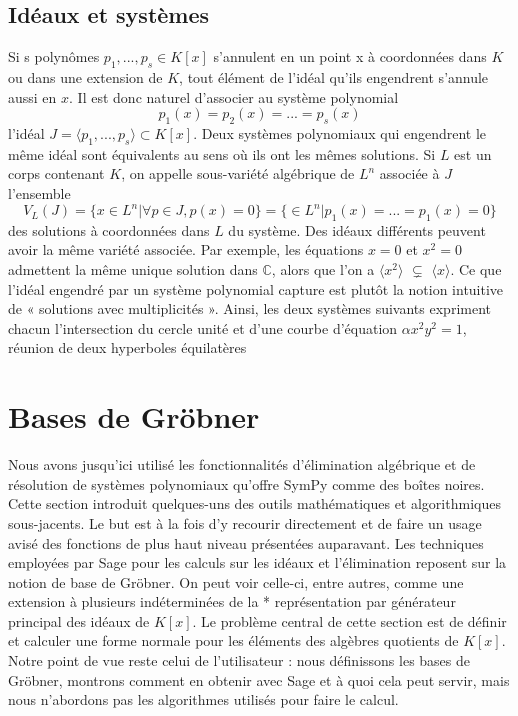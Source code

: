 \subsection{Idéaux et systèmes}
Si s polynômes $p_{1} , . . . , p_{s} \in K\left[x\right]$ s’annulent en un point x à coordonnées
dans $K$ ou dans une extension de $K$, tout élément de l’idéal qu’ils engendrent
s’annule aussi en $x$. Il est donc naturel d’associer au système polynomial
\[
p_{1}\left(x\right)= p_{2}\left(x\right)=...=p_{s}\left(x\right)
\]
l’idéal $J = \langle p_{1}, . . . , p_{s}\rangle \subset K\left[x\right]$. Deux systèmes polynomiaux qui engendrent le même idéal sont équivalents au sens où ils ont les mêmes solutions. Si $L$ est
un corps contenant $K$, on appelle sous-variété algébrique de $L^{n}$ associée à $J$
l’ensemble
\[
V_{L}\left(J\right) = \lbrace x \in L^{n} \vert \forall p \in J, p\left(x\right) = 0 \rbrace =
\lbrace \in L^{n} \vert p_{1}\left(x\right)=...=p_{1}\left(x\right)=0\rbrace
\]
des solutions à coordonnées dans $L$ du système. Des idéaux différents peuvent
avoir la même variété associée. Par exemple, les équations $x = 0$ et $x^{2} = 0$
admettent la même unique solution dans $\mathbb{C}$, alors que l’on a $\langle x^{2}\rangle$ $\subsetneq$ $\langle x\rangle$. Ce que l’idéal engendré par un système polynomial capture est plutôt la notion intuitive
de « solutions avec multiplicités ».
Ainsi, les deux systèmes suivants expriment chacun l’intersection du cercle
unité et d’une courbe d’équation $\alpha x^{2} y^{2} = 1$, réunion de deux hyperboles équilatères 
\section{ Bases de Gröbner}
Nous avons jusqu’ici utilisé les fonctionnalités d’élimination algébrique et de résolution de systèmes polynomiaux qu’offre SymPy comme des boîtes noires. Cette section introduit quelques-uns des outils mathématiques et algorithmiques sous-jacents. Le but est à la fois d’y recourir directement et de faire un usage
avisé des fonctions de plus haut niveau présentées auparavant.
Les techniques employées par Sage pour les calculs sur les idéaux et l’élimination reposent sur la notion de 
base de Gröbner. On peut voir celle-ci, entre autres, comme une extension à plusieurs indéterminées de la *
représentation par générateur principal des idéaux de $K\left[x\right]$. Le problème central de cette section 
est de définir et calculer une forme normale pour les éléments des algèbres quotients de $K\left[x\right]$. 
Notre point de vue reste celui de l’utilisateur : nous définissons les bases de Gröbner, montrons comment en 
obtenir avec Sage et à quoi cela peut servir, mais nous n’abordons pas les algorithmes utilisés pour faire le 
calcul.

